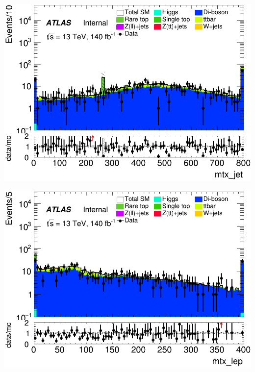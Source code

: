 \documentclass[usenames,dvipsnames]{beamer}
\begin{document}
\begin{frame}
    \begin{minipage}{0.32\textwidth}
        \centering
        \includegraphics[width=\textwidth]{graphics/LLL_met/LLL_met_mtx_jet.png}
    \end{minipage}
        \hfill
    \begin{minipage}{0.32\textwidth}
        \centering
        \includegraphics[width=\textwidth]{graphics/LLL_met/LLL_met_mtx_lep.png}
    \end{minipage}
    \hfill
    \begin{minipage}{0.32\textwidth}
        \centering

\end{minipage}
\end{frame}
\end{document}
